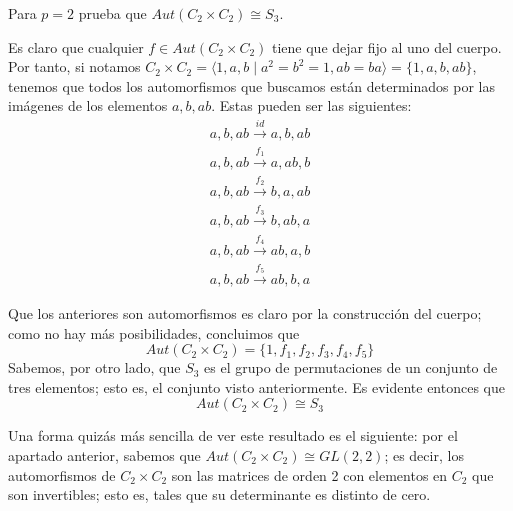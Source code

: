 \documentclass[a4paper, 11pt]{article}
\begin{document}
  \begin{apartado}
      Para $p=2$ prueba que $Aut(C_2 \times C_2) \cong S_3$.
  \end{apartado}

  \begin{solucion}
      Es claro que cualquier $f \in Aut(C_2 \times C_2)$ tiene que dejar fijo al uno del cuerpo. Por tanto, si notamos $C_2 \times C_2 = \langle1,a,b \;|\; a^2=b^2=1, ab=ba\rangle = \{ 1,a,b,ab\}$, tenemos que todos los automorfismos que buscamos están determinados por las imágenes de los elementos ${a,b,ab}$. Estas pueden ser las siguientes:
      \begin{align*}
          a,b,ab \xrightarrow{id} a,b,ab \\
          a,b,ab \xrightarrow{f_1} a,ab,b \\
          a,b,ab \xrightarrow{f_2} b,a,ab \\
          a,b,ab \xrightarrow{f_3} b,ab,a \\
          a,b,ab \xrightarrow{f_4} ab,a,b \\
          a,b,ab \xrightarrow{f_5} ab,b,a
      \end{align*}

      Que los anteriores son automorfismos es claro por la construcción del cuerpo; como no hay más posibilidades, concluimos que
      \[
      Aut(C_2 \times C_2) = \{ 1,f_1,f_2,f_3,f_4,f_5 \}
      \]
      Sabemos, por otro lado, que $S_3$ es el grupo de permutaciones de un conjunto de tres elementos; esto es, el conjunto visto anteriormente. Es evidente entonces que
      \[
      Aut(C_2 \times C_2) \cong S_3
      \]

      Una forma quizás más sencilla de ver este resultado es el siguiente: por el apartado anterior, sabemos que $Aut(C_2 \times C_2) \cong GL(2,2)$; es decir, los automorfismos de $C_2 \times C_2$ son las matrices de orden 2 con elementos en $C_2$ que son invertibles; esto es, tales que su determinante es distinto de cero.


\end{solucion}
\end{document}
